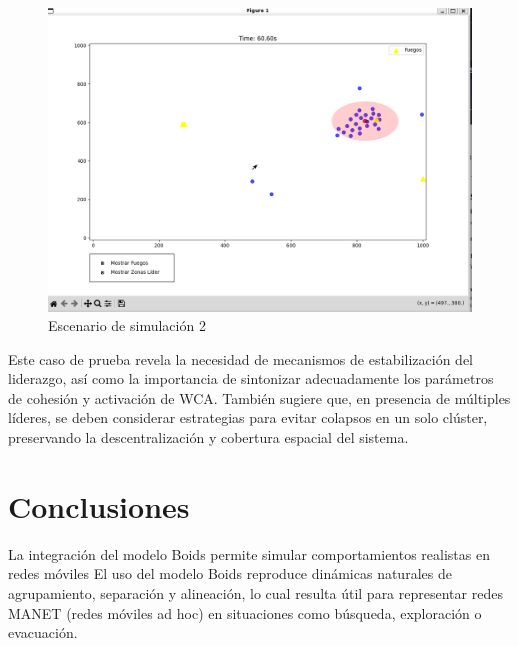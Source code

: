 \documentclass{article}
\begin{document}
\begin{figure}
    \centering
    \includegraphics[width=1\linewidth]{escenario2.png}
    \caption{Escenario de simulación 2}
    \label{fig:enter-label}
\end{figure}

\noindent Este caso de prueba revela la necesidad de mecanismos de estabilización del liderazgo, así como la importancia de sintonizar adecuadamente los parámetros de cohesión y activación de WCA. También sugiere que, en presencia de múltiples líderes, se deben considerar estrategias para evitar colapsos en un solo clúster, preservando la descentralización y cobertura espacial del sistema.


\section{Conclusiones}\label{sec:concl}

La integración del modelo Boids permite simular comportamientos realistas en redes móviles
El uso del modelo Boids reproduce dinámicas naturales de agrupamiento, separación y alineación, lo cual resulta útil para representar redes MANET (redes móviles ad hoc) en situaciones como búsqueda, exploración o evacuación.
\end{document}
